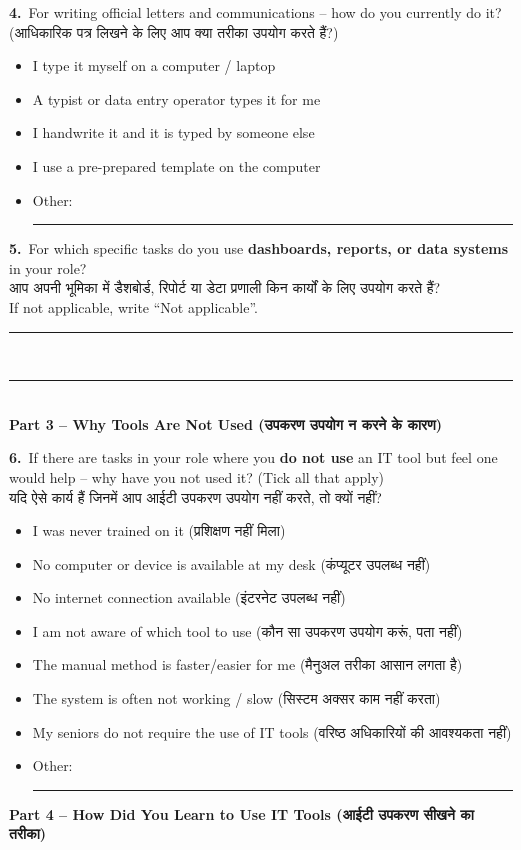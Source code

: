\documentclass[11pt,a4paper]{article}
\newcommand{\hindi}[1]{{\hindifont #1}}
\newcommand{\q}[2]{%
  \vspace{4pt}
  \noindent\textbf{#1.}~#2\\[2pt]
}
\newcommand{\ans}{%
  \noindent\rule{\textwidth}{0.3pt}\\[3pt]
}
\newcommand{\choices}[1]{%
  \begin{itemize}[label=$\square$, leftmargin=1.4em, itemsep=1pt, topsep=2pt]
    #1
  \end{itemize}
}
\begin{document}
\begin{tcolorbox}[colback=streama,colframe=govblue,arc=2mm,boxrule=0.6pt,
  title={\textbf{STREAM A -- For Department Officials \& Employees} \quad \small\hindi{(विभागीय अधिकारी एवं कर्मचारी)}},fonttitle=\normalsize]
\q{4}{For writing official letters and communications -- how do you currently do it? \hindi{(आधिकारिक पत्र लिखने के लिए आप क्या तरीका उपयोग करते हैं?)}}
\choices{
  \item I type it myself on a computer / laptop
  \item A typist or data entry operator types it for me
  \item I handwrite it and it is typed by someone else
  \item I use a pre-prepared template on the computer
  \item Other: \rule{6cm}{0.3pt}
}

\q{5}{For which specific tasks do you use \textbf{dashboards, reports, or data systems} in your role?\\
\hindi{आप अपनी भूमिका में डैशबोर्ड, रिपोर्ट या डेटा प्रणाली किन कार्यों के लिए उपयोग करते हैं?}\\
If not applicable, write ``Not applicable''.}
\ans\ans

\vspace{4pt}
\textbf{\color{govblue}Part 3 -- Why Tools Are Not Used \hindi{(उपकरण उपयोग न करने के कारण)}}
\vspace{4pt}

\q{6}{If there are tasks in your role where you \textbf{do not use} an IT tool but feel one would help -- why have you not used it? (Tick all that apply)\\
\hindi{यदि ऐसे कार्य हैं जिनमें आप आईटी उपकरण उपयोग नहीं करते, तो क्यों नहीं?}}
\choices{
  \item I was never trained on it \hindi{(प्रशिक्षण नहीं मिला)}
  \item No computer or device is available at my desk \hindi{(कंप्यूटर उपलब्ध नहीं)}
  \item No internet connection available \hindi{(इंटरनेट उपलब्ध नहीं)}
  \item I am not aware of which tool to use \hindi{(कौन सा उपकरण उपयोग करूं, पता नहीं)}
  \item The manual method is faster/easier for me \hindi{(मैनुअल तरीका आसान लगता है)}
  \item The system is often not working / slow \hindi{(सिस्टम अक्सर काम नहीं करता)}
  \item My seniors do not require the use of IT tools \hindi{(वरिष्ठ अधिकारियों की आवश्यकता नहीं)}
  \item Other: \rule{6cm}{0.3pt}
}

\vspace{4pt}
\textbf{\color{govblue}Part 4 -- How Did You Learn to Use IT Tools \hindi{(आईटी उपकरण सीखने का तरीका)}}
\vspace{4pt}


\end{tcolorbox}
\end{document}
